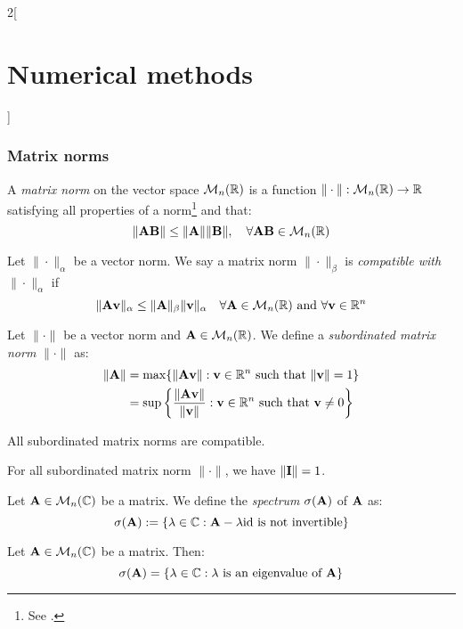 \documentclass[../../../main_math.tex]{subfiles}
\begin{document}
\begin{multicols}{2}[\section{Numerical methods}]
  \subsubsection{Matrix norms}
  \begin{definition}
    A \emph{matrix norm} on the vector space $\mathcal{M}_n(\mathbb{R})$ is a function $\|\cdot\|:\mathcal{M}_n(\mathbb{R})\rightarrow\mathbb{R}$ satisfying all properties of a norm\footnote{See .} and that: $$\|\boldsymbol{\mathrm{A}}\boldsymbol{\mathrm{B}}\|\leq\|\boldsymbol{\mathrm{A}}\|\|\boldsymbol{\mathrm{B}}\|,\quad\forall \boldsymbol{\mathrm{A}}\boldsymbol{\mathrm{B}}\in\mathcal{M}_n(\mathbb{R})$$
  \end{definition}
  \begin{definition}
    Let $\|\cdot\|_\alpha$ be a vector norm. We say a matrix norm $\|\cdot\|_\beta$ is \emph{compatible with} $\|\cdot\|_\alpha$ if $$\|\boldsymbol{\mathrm{A}}\boldsymbol{\mathrm{v}}\|_\alpha\leq\|\boldsymbol{\mathrm{A}}\|_\beta\|\boldsymbol{\mathrm{v}}\|_\alpha\quad\forall\boldsymbol{\mathrm{A}}\in\mathcal{M}_n(\mathbb{R})\text{ and }\forall\boldsymbol{\mathrm{v}}\in\mathbb{R}^n$$
  \end{definition}
  \begin{definition}
    Let $\|\cdot\|$ be a vector norm and $\boldsymbol{\mathrm{A}}\in\mathcal{M}_n(\mathbb{R})$. We define a \emph{subordinated matrix norm} $\|\cdot\|$ as:
    \begin{align*}
      \|\boldsymbol{\mathrm{A}}\| & =\max\{\|\boldsymbol{\mathrm{A}}\boldsymbol{\mathrm{v}}\|:\boldsymbol{\mathrm{v}}\in\mathbb{R}^n\text{ such that }\|\boldsymbol{\mathrm{v}}\|=1\}                              \\
                 & =\sup\left\{\frac{\|\boldsymbol{\mathrm{A}}\boldsymbol{\mathrm{v}}\|}{\|\boldsymbol{\mathrm{v}}\|}:\boldsymbol{\mathrm{v}}\in\mathbb{R}^n\text{ such that }\boldsymbol{\mathrm{v}}\ne 0\right\}
    \end{align*}
  \end{definition}
  \begin{lemma}
    All subordinated matrix norms are compatible.
  \end{lemma}
  \begin{lemma}
    For all subordinated matrix norm $\|\cdot\|$, we have $\|\boldsymbol{\mathrm{I}}\|=1$.
  \end{lemma}
  \begin{definition}
    Let $\boldsymbol{\mathrm{A}}\in\mathcal{M}_n(\mathbb{C})$ be a matrix. We define the \emph{spectrum} $\sigma(\boldsymbol{\mathrm{A}})$ of $\boldsymbol{\mathrm{A}}$ as: $$\sigma(\boldsymbol{\mathrm{A}}):=\{\lambda\in\mathbb{C}:\boldsymbol{\mathrm{A}}-\lambda\mathrm{id}\text{ is not invertible}\}$$
  \end{definition}
  \begin{proposition}
    Let $\boldsymbol{\mathrm{A}}\in\mathcal{M}_n(\mathbb{C})$ be a matrix. Then: $$\sigma(\boldsymbol{\mathrm{A}})=\{\lambda\in\mathbb{C}:\lambda\text{ is an eigenvalue of }\boldsymbol{\mathrm{A}}\}$$
  \end{proposition}
  \begin{definition}

\end{definition}
\end{multicols}
\end{document}
